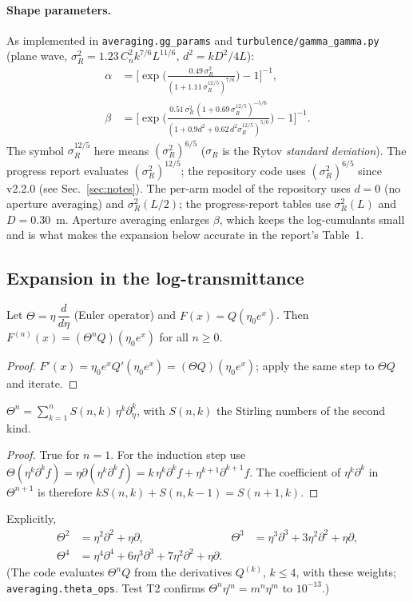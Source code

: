 \paragraph{Shape parameters.}
As implemented in \texttt{averaging.gg\_params} and \texttt{turbulence/gamma\_gamma.py} (plane wave, $\sigma_R^2=1.23\,C_n^2k^{7/6}L^{11/6}$, $d^2=kD^2/4L$):
\begin{align}
  \alpha&=\Big[\exp\!\Big(\tfrac{0.49\,\sigma_R^2}{(1+1.11\,\sigma_R^{12/5})^{7/6}}\Big)-1\Big]^{-1},\\
  \beta&=\Big[\exp\!\Big(\tfrac{0.51\,\sigma_R^2\,(1+0.69\,\sigma_R^{12/5})^{-5/6}}{(1+0.9d^2+0.62\,d^2\sigma_R^{12/5})^{5/6}}\Big)-1\Big]^{-1}.
\end{align}
The symbol $\sigma_R^{12/5}$ here means $(\sigma_R^2)^{6/5}$ ($\sigma_R$ is the Rytov \emph{standard deviation}). The progress report evaluates $(\sigma_R^2)^{12/5}$; the repository code uses $(\sigma_R^2)^{6/5}$ since v2.2.0 (see Sec.~\ref{sec:notes}). The per-arm model of the repository uses $d=0$ (no aperture averaging) and $\sigma_R^2(L/2)$; the progress-report tables use $\sigma_R^2(L)$ and $D=0.30$~m. Aperture averaging enlarges $\beta$, which keeps the log-cumulants small and is what makes the expansion below accurate in the report's Table~1.

\subsection{Expansion in the log-transmittance}

\begin{lemma}[derivatives with respect to $x=\ln\eta$]\label{lem:theta}
Let $\Theta=\eta\,\dfrac{d}{d\eta}$ (Euler operator) and $F(x)=Q(\eta_0e^{x})$. Then $F^{(n)}(x)=(\Theta^nQ)(\eta_0e^{x})$ for all $n\ge0$.
\end{lemma}
\begin{proof}
$F'(x)=\eta_0e^{x}Q'(\eta_0e^{x})=(\Theta Q)(\eta_0e^{x})$; apply the same step to $\Theta Q$ and iterate.
\end{proof}

\begin{lemma}\label{lem:stirling}
$\Theta^n=\sum_{k=1}^{n}S(n,k)\,\eta^{k}\partial_\eta^{k}$, with $S(n,k)$ the Stirling numbers of the second kind.
\end{lemma}
\begin{proof}
True for $n=1$. For the induction step use $\Theta(\eta^{k}\partial^{k}f)=\eta\partial(\eta^{k}\partial^{k}f)=k\,\eta^{k}\partial^{k}f+\eta^{k+1}\partial^{k+1}f$. The coefficient of $\eta^{k}\partial^{k}$ in $\Theta^{n+1}$ is therefore $kS(n,k)+S(n,k-1)=S(n+1,k)$.
\end{proof}
Explicitly,
\begin{align}
  \Theta^2&=\eta^2\partial^2+\eta\partial, &
  \Theta^3&=\eta^3\partial^3+3\eta^2\partial^2+\eta\partial,\\
  \Theta^4&=\eta^4\partial^4+6\eta^3\partial^3+7\eta^2\partial^2+\eta\partial. & &
\end{align}
(The code evaluates $\Theta^nQ$ from the derivatives $Q^{(k)}$, $k\le4$, with these weights; \texttt{averaging.theta\_ops}. Test T2 confirms $\Theta^n\eta^m=m^n\eta^m$ to $10^{-13}$.)

